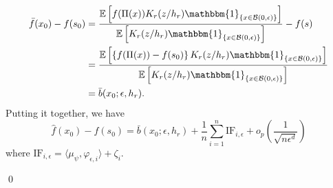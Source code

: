 \documentclass[11pt]{article}
\begin{document}
\begin{align*}
    \bar{f}(x_0) - f(s_0) &= \frac{\mathbb{E}\left[f(\Pi(x))K_r(z/h_r)\mathbbm{1}_{\{x\in \mathcal{B}(0, \epsilon)\}}\right]}{\mathbb{E}\left[K_r(z/h_r)\mathbbm{1}_{\{x\in \mathcal{B}(0, \epsilon)\}}\right]} - f(s) \\
    &= \frac{\mathbb{E}\left[\left\{f(\Pi(x)) - f(s_0)\right\}K_r(z/h_r)\mathbbm{1}_{\{x\in \mathcal{B}(0, \epsilon)\}}\right]}{\mathbb{E}\left[K_r(z/h_r)\mathbbm{1}_{\{x\in \mathcal{B}(0, \epsilon)\}}\right]}\\
    &= \bar{b}(x_0; \epsilon, h_r).
\end{align*}
Putting it together, we have 
\begin{equation*}
    \hat{f}(x_0) - f(s_0) = \bar{b}(x_0; \epsilon, h_r) + \frac{1}{n}\sum_{i = 1}^n\text{IF}_{i, \epsilon} + o_p\left(\frac{1}{\sqrt{n\epsilon^d}}\right)
\end{equation*}
where $\text{IF}_{i, \epsilon} = \langle \mu_{\psi}, \varphi_{\epsilon, i}\rangle + \zeta_i.$

\qed{}
\end{document}
